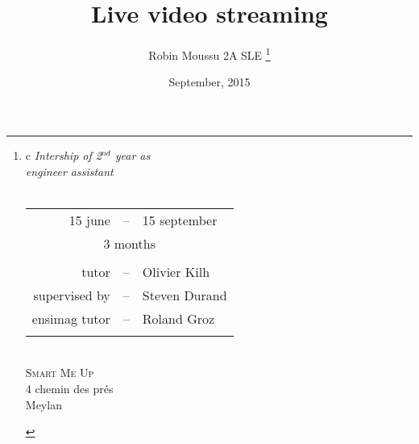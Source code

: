 \documentclass[a4paper,11pt]{custom}
\newcommand{\smu}{\textsc{Smart Me Up}}
\begin{document}



\title{
  Live video streaming
}
\author{
  Robin Moussu 2A SLE
  \thanks{
  \begin{tabular}{c}
    \textit{Intership of 2$^{nd}$ year as}\\
    \textit{engineer assistant}\\
    \vspace{2em}\\
    \begin{tabular}{rcl}
      15 june &--& 15 september\\
      \multicolumn{3}{c}{3 months}\\
      \\
      tutor &--& Olivier Kilh \\
      supervised by &--& Steven Durand \\
      ensimag tutor &--& Roland Groz\\
      \\
    \end{tabular}
    \vspace{2em}\\
    \smu\\
    4 chemin des prés\\
    Meylan\\
  \end{tabular}
  }
}
\date{
  September, 2015
}
\maketitle
\end{document}
